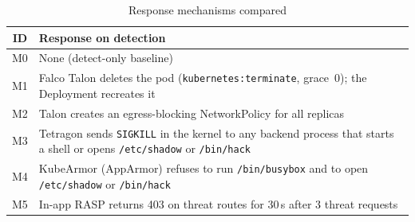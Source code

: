 \documentclass[10pt,conference]{IEEEtran}
\begin{document}
\begin{table}[t]
\caption{Response mechanisms compared}
\label{tab:mech}
\centering
\begin{tabular}{@{}cp{}@{}}
\toprule
ID & Response on detection\\
\midrule
M0 & None (detect-only baseline)\\
M1 & Falco Talon deletes the pod (\texttt{kubernetes:terminate}, grace~0); the Deployment recreates it\\
M2 & Talon creates an egress-blocking NetworkPolicy for all replicas\\
M3 & Tetragon sends \texttt{SIGKILL} in the kernel to any backend process that starts a shell or opens \texttt{/etc/shadow} or \texttt{/bin/hack}\\
M4 & KubeArmor (AppArmor) refuses to run \texttt{/bin/busybox} and to open \texttt{/etc/shadow} or \texttt{/bin/hack}\\
M5 & In-app RASP returns 403 on threat routes for 30\,s after 3 threat requests\\
\bottomrule
\end{tabular}
\end{table}
\end{document}
